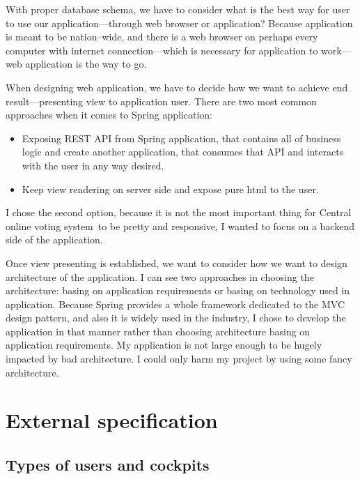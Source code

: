\documentclass[a4paper,twoside,12pt]{book}
\newcommand{\Title}{Central online voting system}
\begin{document}
    With proper database schema, we have to consider what is the best way for user to use our application---through web browser or application?
    Because application is meant to be nation--wide, 
    and there is a web browser on perhaps every computer with internet connection---which is necessary for application to work---web application is the way to go.
    
    When designing web application, we have to decide how we want to achieve end result---presenting view to application user.
    There are two most common approaches when it comes to Spring application:
    \begin{itemize}
      \item Exposing REST API from Spring application, that contains all of business logic and create another application, that consumes that API and interacts with the user in any way desired.
      \item Keep view rendering on server side and expose pure html to the user.
    \end{itemize}
    I chose the second option, because it is not the most important thing for \Title\ to be pretty and responsive, I wanted to focus on a backend side of the application.

    Once view presenting is established, we want to consider how we want to design architecture of the application.
    I can see two approaches in choosing the architecture: basing on application requirements or basing on technology used in application.
    Because Spring provides a whole framework dedicated to the MVC design pattern, and also it is widely used in the industry, I chose to develop the application in that manner
    rather than choosing architecture basing on application requirements. 
    My application is not large enough to be hugely impacted by bad architecture. I could only harm my project by using some fancy architecture.

\chapter{External specification}
  \section{Types of users and cockpits}
\end{document}
